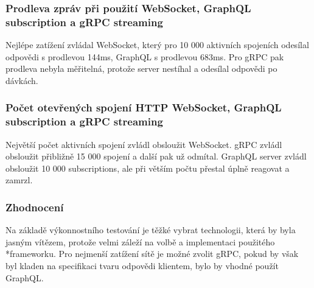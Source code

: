\documentclass[thesis=M,czech]{FITthesis}[2019/12/23]
\begin{document}
\subsubsection*{Prodleva zpráv při použití WebSocket, GraphQL subscription a gRPC streaming}
Nejlépe zatížení zvládal WebSocket, který pro 10 000 aktivních spojeních odesílal odpovědi s prodlevou 144ms, GraphQL s prodlevou 683ms. Pro gRPC pak prodleva nebyla měřitelná, protože server nestíhal a odesílal odpovědi po dávkách.
\subsubsection*{Počet otevřených spojení HTTP WebSocket, GraphQL subscription a gRPC streaming}
Největší počet aktivních spojení zvládl obsloužit WebSocket. gRPC zvládl obsloužit přibližně 15 000 spojení a další pak už odmítal. GraphQL server zvládl obsloužit 10 000 subscriptions, ale při větším počtu přestal úplně reagovat a zamrzl.

\subsubsection*{Zhodnocení}
Na základě výkonnostního testování je těžké vybrat technologii, která by byla jasným vítězem, protože velmi záleží na volbě a implementaci použitého \\*frameworku. Pro nejmenší zatížení sítě je možné zvolit gRPC, pokud by však byl kladen na specifikaci tvaru odpovědi klientem, bylo by vhodné použít GraphQL.
\end{document}
